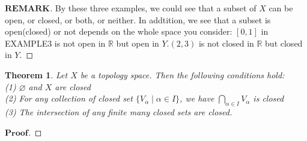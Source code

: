 \documentclass[a4paper, 11pt]{article}
\newtheorem{theorem}{Theorem}
\theoremstyle{remark}
\newenvironment{myremark}
{\renewcommand\qedsymbol{$ $}\begin{proof}[$\mathbf{REMARK}$]}
  {\end{proof}}
\newenvironment{myprf}
{\renewcommand\qedsymbol{$ $}\begin{proof}[$\mathbf{Proof}$]}
  {\end{proof}}
\theoremstyle{definition}
\begin{document}
\begin{myremark}
        By these three examples, we could see that a subset of $X$ can be open, or closed,
        or both, or neither. In addtition, we see that a subset is open(closed) or not depends on
        the whole space you consider: $[0,1]$ in EXAMPLE3 is not open in $\mathbb{R}$ but
        open in $Y$.$(2,3)$ is not closed in $\mathbb{R}$ but closed in $Y$.
\end{myremark}
\begin{theorem}
        Let $X$ be a topology space. Then the following conditions hold:\\
        (1) $\varnothing$ and $X$ are closed\\
        (2) For any collection of closed set $\{V_{\alpha}\mid \alpha\in I\}$, we have
        $\displaystyle \bigcap_{\alpha\in I}V_{\alpha}$ is closed\\
        (3) The intersection of any finite many closed sets are closed.\\
\end{theorem}
\begin{myprf}
        
\end{myprf}
\end{document}
